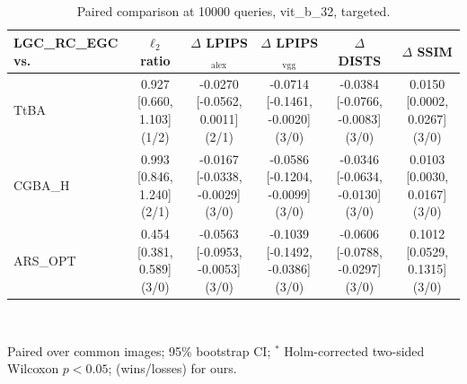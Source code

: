 \begin{table}[t]
\centering\footnotesize
\caption{Paired comparison at 10000 queries, vit\_b\_32, targeted.}
\begin{tabular}{lccccc}
\toprule
LGC\_RC\_EGC vs. & $\ell_2$ ratio & $\Delta$ LPIPS$_{\mathrm{alex}}$ & $\Delta$ LPIPS$_{\mathrm{vgg}}$ & $\Delta$ DISTS & $\Delta$ SSIM \\
\midrule
TtBA & 0.927 [0.660, 1.103] (1/2) & -0.0270 [-0.0562, 0.0011] (2/1) & -0.0714 [-0.1461, -0.0020] (3/0) & -0.0384 [-0.0766, -0.0083] (3/0) & 0.0150 [0.0002, 0.0267] (3/0) \\
CGBA\_H & 0.993 [0.846, 1.240] (2/1) & -0.0167 [-0.0338, -0.0029] (3/0) & -0.0586 [-0.1204, -0.0099] (3/0) & -0.0346 [-0.0634, -0.0130] (3/0) & 0.0103 [0.0030, 0.0167] (3/0) \\
ARS\_OPT & 0.454 [0.381, 0.589] (3/0) & -0.0563 [-0.0953, -0.0053] (3/0) & -0.1039 [-0.1492, -0.0386] (3/0) & -0.0606 [-0.0788, -0.0297] (3/0) & 0.1012 [0.0529, 0.1315] (3/0) \\
\bottomrule
\end{tabular}
\\[2pt]\parbox{\linewidth}{\scriptsize Paired over common images; 95\% bootstrap CI; $^{*}$ Holm-corrected two-sided Wilcoxon $p<0.05$; (wins/losses) for ours.}
\end{table}
